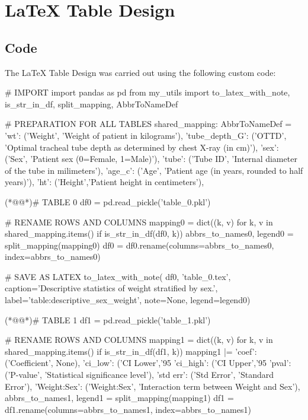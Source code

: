 \documentclass[11pt]{article}
\begin{document}
\section{LaTeX Table Design}
\subsection{{Code}}
The LaTeX Table Design was carried out using the following custom code:

\begin{python}

# IMPORT
import pandas as pd
from my_utils import to_latex_with_note, is_str_in_df, split_mapping, AbbrToNameDef

# PREPARATION FOR ALL TABLES
shared_mapping: AbbrToNameDef = {
    'wt': ('Weight', 'Weight of patient in kilograms'),
    'tube_depth_G': ('OTTD', 'Optimal tracheal tube depth as determined by chest X-ray (in cm)'),
    'sex': ('Sex', 'Patient sex (0=Female, 1=Male)'),
    'tube': ('Tube ID', 'Internal diameter of the tube in milimeters'),
    'age_c': ('Age', 'Patient age (in years, rounded to half years)'),
    'ht': ('Height','Patient height in centimeters'),
}

(*@@*)# TABLE 0
df0 = pd.read_pickle('table_0.pkl')

# RENAME ROWS AND COLUMNS
mapping0 = dict((k, v) for k, v in shared_mapping.items() if is_str_in_df(df0, k))
abbrs_to_names0, legend0 = split_mapping(mapping0)
df0 = df0.rename(columns=abbrs_to_names0, index=abbrs_to_names0)

# SAVE AS LATEX
to_latex_with_note(
    df0, 'table_0.tex',
    caption='Descriptive statistics of weight stratified by sex.', 
    label='table:descriptive_sex_weight',
    note=None,
    legend=legend0)


(*@@*)# TABLE 1
df1 = pd.read_pickle('table_1.pkl')

# RENAME ROWS AND COLUMNS
mapping1 = dict((k, v) for k, v in shared_mapping.items() if is_str_in_df(df1, k)) 
mapping1 |= {
    'coef': ('Coefficient', None),
    'ci_low': ('CI Lower','95%
    'ci_high': ('CI Upper','95%
    'pval': ('P-value', 'Statistical significance level'),
    'std err': ('Std Error', 'Standard Error'),
    'Weight:Sex': ('Weight:Sex', 'Interaction term between Weight and Sex'),
}
abbrs_to_names1, legend1 = split_mapping(mapping1)
df1 = df1.rename(columns=abbrs_to_names1, index=abbrs_to_names1)


\end{python}
\end{document}
